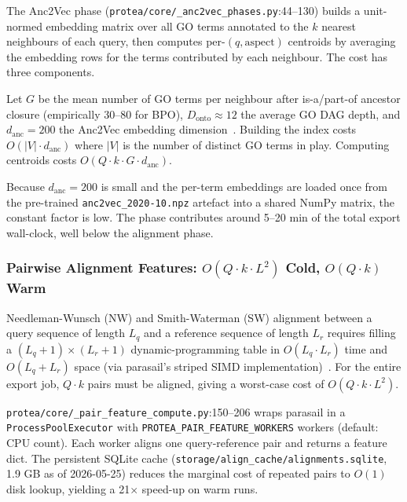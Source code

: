 The Anc2Vec phase
(\texttt{protea/core/\_anc2vec\_phases.py}:44--130) builds a
unit-normed embedding matrix over all GO terms annotated to the $k$
nearest neighbours of each query, then computes per-$(q, \text{aspect})$
centroids by averaging the embedding rows for the terms contributed by each
neighbour. The cost has three components.

\begin{definition}
  Let $G$ be the mean number of GO terms per neighbour after is-a/part-of
  ancestor closure (empirically 30--80 for BPO), $D_{\mathrm{onto}} \approx
  12$ the average GO DAG depth, and $d_{\mathrm{anc}} = 200$ the Anc2Vec
  embedding dimension~\cite{edera2022anc2vec}. Building the index costs
  $O(|V| \cdot d_{\mathrm{anc}})$ where $|V|$ is the number of distinct GO
  terms in play. Computing centroids costs $O(Q \cdot k \cdot G \cdot
  d_{\mathrm{anc}})$.
\end{definition}

Because $d_{\mathrm{anc}} = 200$ is small and the per-term embeddings are
loaded once from the pre-trained \texttt{anc2vec\_2020-10.npz} artefact
into a shared NumPy matrix, the constant factor is low. The phase
contributes around 5--20 min of the total export wall-clock, well below the
alignment phase.

\subsubsection{Pairwise Alignment Features: $O(Q \cdot k \cdot L^2)$ Cold,
  $O(Q \cdot k)$ Warm}
\label{sssec:alignment}

Needleman-Wunsch (NW) and Smith-Waterman (SW) alignment between a query
sequence of length $L_q$ and a reference sequence of length $L_r$ requires
filling a $(L_q + 1) \times (L_r + 1)$ dynamic-programming table in
$O(L_q \cdot L_r)$ time and $O(L_q + L_r)$ space (via parasail's
striped SIMD
implementation)~\cite{needleman1970general,smith1981identification}. For
the entire export job, $Q \cdot k$ pairs must be aligned, giving a
worst-case cost of $O(Q \cdot k \cdot L^2)$.

\begin{definition}
  \texttt{protea/core/\_pair\_feature\_compute.py}:150--206 wraps parasail
  in a \texttt{ProcessPoolExecutor} with \texttt{PROTEA\_PAIR\_FEATURE\_WORKERS}
  workers (default: CPU count). Each worker aligns one query-reference pair
  and returns a feature dict. The persistent SQLite cache
  (\texttt{storage/align\_cache/alignments.sqlite}, 1.9 GB as of 2026-05-25)
  reduces the marginal cost of repeated pairs to $O(1)$ disk lookup, yielding
  a 21$\times$ speed-up on warm runs.
\end{definition}

